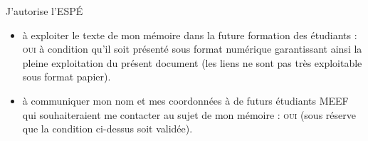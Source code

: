\documentclass[french]{report}
\begin{document}
J'autorise l'ESP\'E
\begin{itemize}
\item à exploiter le texte de mon mémoire dans la future formation des
  étudiants : \textsc{oui} à condition qu'il soit présenté sous format
  numérique garantissant ainsi la pleine exploitation du présent
  document (les liens ne sont pas très exploitable sous format
  papier).
\item à communiquer mon nom et mes coordonnées à de futurs étudiants
  MEEF qui souhaiteraient me contacter au sujet de mon mémoire :
  \textsc{oui} (sous réserve que la condition ci-dessus soit validée).
\end{itemize}





%


\end{document}
